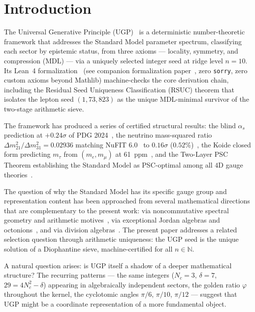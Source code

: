 \documentclass[11pt]{article}
\theoremstyle{remark}
\newcommand{\Nc}{N_c}
\newcommand{\ddelta}{\delta}
\newcommand{\PHI}{\varphi}
\begin{document}
\tableofcontents
\newpage

\section{Introduction}
\label{sec:intro}

The Universal Generative Principle (UGP)~\cite{Spivack2026_SM_UGP} is a
deterministic number-theoretic framework that addresses the Standard Model parameter
spectrum, classifying each sector by epistemic status, from three axioms --- locality, symmetry, and compression (MDL) --- via a
uniquely selected integer seed at ridge level $n{=}10$.
Its Lean~4 formalization~\cite{SpivackUGPFormalization,ugp-lean} (see companion formalization paper~\cite{SpivackUGPFormalization}, zero
\texttt{sorry}, zero custom axioms beyond Mathlib) machine-checks the core derivation
chain, including the Residual Seed Uniqueness Classification (RSUC) theorem that
isolates the lepton seed $(1, 73, 823)$ as the unique MDL-minimal survivor of the
two-stage arithmetic sieve.

The framework has produced a series of certified structural results: the blind
$\alpha_s$ prediction at $+0.24\sigma$ of PDG 2024~\cite{Spivack2026_SM_UGP}, the neutrino
mass-squared ratio $\Delta m^2_{21}/\Delta m^2_{31} = 0.02936$ matching NuFIT 6.0~\cite{NuFIT60} to
$0.16\sigma$ ($0.52\%$)~\cite{SpivackNeutrino}, the Koide closed form predicting $m_\tau$ from
$(m_e, m_\mu)$ at 61~ppm~\cite{Spivack2026_Koide}, and the Two-Layer PSC Theorem
establishing the Standard Model as PSC-optimal among all $4$D gauge
theories~\cite{SpivackNEMS05}.

The question of why the Standard Model has its specific gauge group and
representation content has been approached from several mathematical directions
that are complementary to the present work: via noncommutative spectral geometry
and arithmetic motives~\cite{ConnesMarcolli2008,MarcolliManin2020}, via exceptional
Jordan algebras and octonions~\cite{BaezHuerta2010,Baez2021SM}, and via division
algebras~\cite{Furey2022}.  The present paper addresses a related selection question
through arithmetic uniqueness: the UGP seed is the unique solution of a
Diophantine sieve, machine-certified for all $n \in \mathbb{N}$.

A natural question arises: is UGP itself a shadow of a deeper mathematical structure?
The recurring patterns --- the same integers ($\Nc = 3$, $\ddelta = 7$,
$29 = 4\Nc^2 - \ddelta$) appearing in algebraically independent sectors, the golden
ratio $\PHI$ throughout the kernel, the cyclotomic angles $\pi/6$, $\pi/10$, $\pi/12$
--- suggest that UGP might be a coordinate representation of a more fundamental object.
\end{document}
